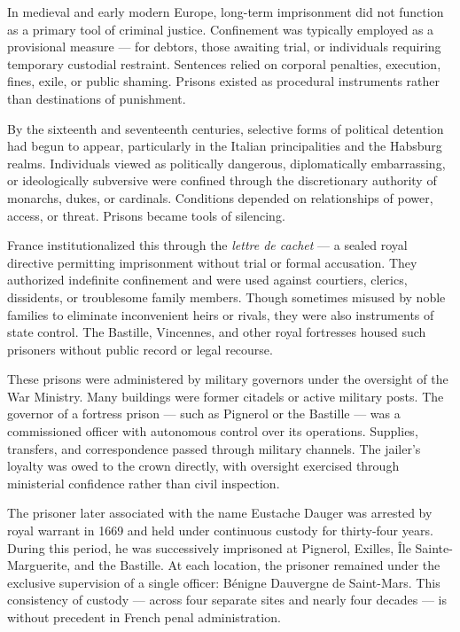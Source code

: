 In medieval and early modern Europe, long-term imprisonment did not function as a primary tool of criminal justice. Confinement was typically employed as a provisional measure — for debtors, those awaiting trial, or individuals requiring temporary custodial restraint. Sentences relied on corporal penalties, execution, fines, exile, or public shaming. Prisons existed as procedural instruments rather than destinations of punishment.

By the sixteenth and seventeenth centuries, selective forms of political detention had begun to appear, particularly in the Italian principalities and the Habsburg realms. Individuals viewed as politically dangerous, diplomatically embarrassing, or ideologically subversive were confined through the discretionary authority of monarchs, dukes, or cardinals. Conditions depended on relationships of power, access, or threat. Prisons became tools of silencing.

France institutionalized this through the \textit{lettre de cachet} — a sealed royal directive permitting imprisonment without trial or formal accusation. They authorized indefinite confinement and were used against courtiers, clerics, dissidents, or troublesome family members. Though sometimes misused by noble families to eliminate inconvenient heirs or rivals, they were also instruments of state control. The Bastille, Vincennes, and other royal fortresses housed such prisoners without public record or legal recourse.

These prisons were administered by military governors under the oversight of the War Ministry. Many buildings were former citadels or active military posts. The governor of a fortress prison — such as Pignerol or the Bastille — was a commissioned officer with autonomous control over its operations. Supplies, transfers, and correspondence passed through military channels. The jailer's loyalty was owed to the crown directly, with oversight exercised through ministerial confidence rather than civil inspection.

The prisoner later associated with the name Eustache Dauger was arrested by royal warrant in 1669 and held under continuous custody for thirty-four years. During this period, he was successively imprisoned at Pignerol, Exilles, Île Sainte-Marguerite, and the Bastille. At each location, the prisoner remained under the exclusive supervision of a single officer: Bénigne Dauvergne de Saint-Mars. This consistency of custody — across four separate sites and nearly four decades — is without precedent in French penal administration.


